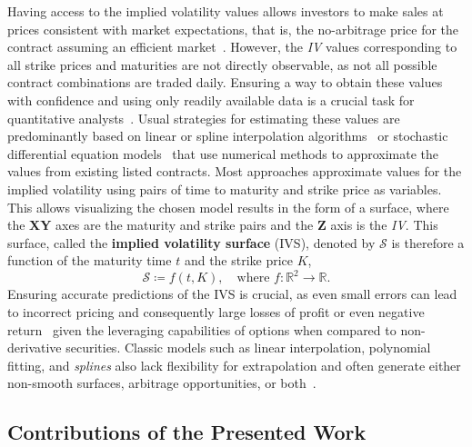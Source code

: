 Having access to the implied volatility values allows investors to make sales at prices consistent with market expectations,
that is, the no-arbitrage price for the contract assuming an efficient market~\citep{Hull2018}.
However, the \textit{IV} values corresponding to all strike prices and maturities are not directly observable,
as not all possible contract combinations are traded daily.
Ensuring a way to obtain these values with confidence and using only readily available data is a crucial task for quantitative analysts~\citep{Kim2006}.
Usual strategies for estimating these values are predominantly based on linear or spline interpolation
algorithms~\citep{Homescu2011} or stochastic differential equation models~\citep{Jordan2011}
that use numerical methods to approximate the values from existing listed contracts.
Most approaches approximate values for the implied volatility using pairs of time to maturity and strike price as variables.
This allows visualizing the chosen model results in the form of a surface,
where the \textbf{XY} axes are the maturity and strike pairs and the \textbf{Z} axis is the \textit{IV}.
This surface, called the \textbf{implied volatility surface} (IVS), denoted by $\mathcal{S}$ is therefore a function of the maturity time $t$ and the strike price $K$,
\begin{equation}
    \label{eq:ivs}
    \mathcal{S} \coloneqq f(t, K), \quad \text{where } f \colon \mathbb{R}^{2} \to \mathbb{R}.
\end{equation}
Ensuring accurate predictions of the IVS is crucial, as even small errors can lead to incorrect pricing and consequently
large losses of profit or even negative return~\citep{Hagan2014} given the leveraging capabilities of options when compared to non-derivative securities.
Classic models such as linear interpolation, polynomial fitting, and \textit{splines} also lack flexibility for extrapolation
and often generate either non-smooth surfaces, arbitrage opportunities, or both~\citep{Hagan2014}.

\subsection{Contributions of the Presented Work}
\label{subsec:contributions}

